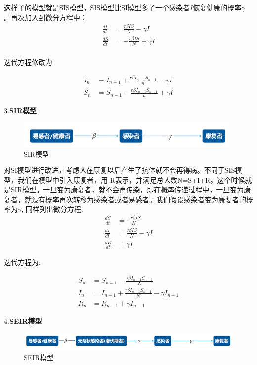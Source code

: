 \documentclass[a4paper, 11pt,twoside=true,UTF8]{scrartcl}
\begin{document}
这样子的模型就是SIS模型，SIS模型比SI模型多了一个感染者$I$恢复健康的概率$\gamma$ 。再次加入到微分方程中：
$$
\begin{aligned}
\frac{dI}{dt}&=\frac{r\beta IS}{N}-\gamma I\\
\frac{dS}{dt}&=-\frac{r\beta IS}{N}+\gamma I\\
\end{aligned}
$$

迭代方程修改为

$$
\begin{aligned}
I_n&=I_{n-1}+\frac{r\beta I_{n-1}S_{n-1}}{n}-\gamma I  \\
S_n&=S_{n-1}-\frac{r\beta I_{n-1}S_{n-1}}{n}+\gamma I
\end{aligned}
$$

3.\textbf{SIR模型}
\begin{figure}[H]
	\small
	\centering
	\includegraphics[width=11cm]{C3}
	\caption{SIR模型} \label{C3}
\end{figure}

对SI模型进行改进，考虑人在康复以后产生了抗体就不会再得病。不同于SIS模型，我们在模型中引入康复者，用 R表示，并满足总人数N=S+I+R。这个时候就是SIR模型。一旦变为康复者，就不会再传染，即在概率传递过程中，一旦变为康复者，就没有概率再次转移为感染者或者易感者。我们假设感染者变为康复者的概率为$\gamma $, 同样列出微分方程:
$$
\begin{aligned}
\frac{dS}{dt}&=\frac{-r\beta IS}{N}  \\
\frac{dI}{dt}&=\frac{r\beta IS}{N}-\gamma I \\
\frac{dR}{dt}&=\gamma I
\end{aligned}
$$

迭代方程为:

$$
\begin{aligned}
S_n&=S_{n-1}-\frac{r\beta I_{n-1}S_{n-1}}{N}  \\
I_n&=I_{n-1}+\frac{r\beta I_{n-1}S_{n-1}}{N}-\gamma I_{n-1}  \\
R_n&=R_{n-1}+\gamma I_{n-1}
\end{aligned}
$$

4.\textbf{SEIR模型}
\begin{figure}[H]
	\small
	\centering
	\includegraphics[width=13cm]{C4}
	\caption{SEIR模型} \label{C4}
\end{figure}
\end{document}
